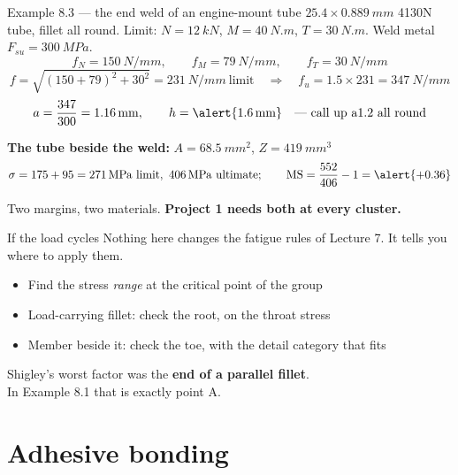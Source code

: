 \documentclass[aspectratio=169,10pt]{beamer}
\begin{document}
\begin{frame}{Example 8.3 --- the end weld of an engine-mount tube}
\footnotesize
$25.4\times\SI{0.889}{mm}$ 4130N tube, fillet all round. Limit: $N=\SI{12}{kN}$, $M=\SI{40}{N.m}$,
$T=\SI{30}{N.m}$. Weld metal $F_{su}=\SI{300}{MPa}$.
\[ f_N=\SI{150}{N/mm},\qquad f_M=\SI{79}{N/mm},\qquad f_T=\SI{30}{N/mm} \]
\[ f=\sqrt{(150+79)^2+30^2}=\SI{231}{N/mm}\ \text{limit}\quad\Rightarrow\quad f_u=1.5\times231=\SI{347}{N/mm} \]
\[ a=\frac{347}{300}=\SI{1.16}{mm},\qquad h=\alert{\SI{1.6}{mm}}\quad\text{--- call up a1.2 all round} \]

\textbf{The tube beside the weld:} $A=\SI{68.5}{mm^2}$, $Z=\SI{419}{mm^3}$
\[ \sigma=175+95=\SI{271}{MPa}\ \text{limit},\ \SI{406}{MPa}\ \text{ultimate};\qquad \mathrm{MS}=\frac{552}{406}-1=\alert{+0.36} \]

Two margins, two materials. \textbf{Project 1 needs both at every cluster.}
\end{frame}

\begin{frame}{If the load cycles}
Nothing here changes the fatigue rules of Lecture 7. It tells you \alert{where} to apply them.

\medskip
\begin{itemize}
  \item Find the stress \emph{range} at the critical point of the group
  \item Load-carrying fillet: check the root, on the throat stress
  \item Member beside it: check the toe, with the detail category that fits
\end{itemize}
\vfill
Shigley's worst factor was the \textbf{end of a parallel fillet}.\\
In Example 8.1 that is exactly point A.
\end{frame}

\section{Adhesive bonding}
\end{document}
